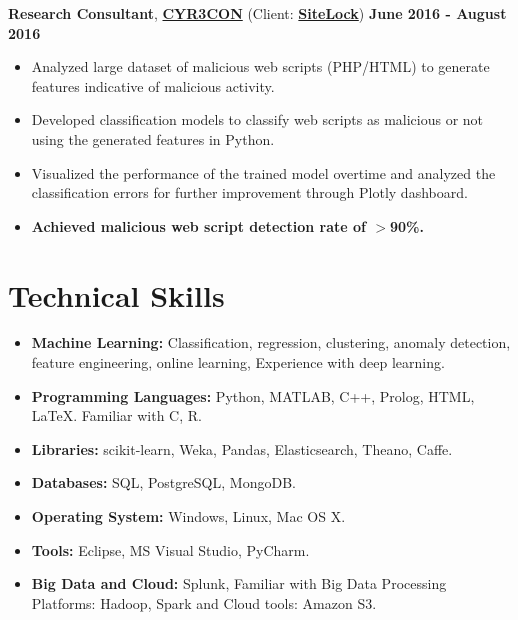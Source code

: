 \documentclass[margin,line]{CV}
\begin{document}
\begin{resume}
\begin{itemize}
\end{itemize}


{\bf Research Consultant}, \href{http://www.cyr3con.com/}{\bf CYR3CON} (Client: \href{https://www.sitelock.com/}{\bf SiteLock})  \hfill {\bf June 2016 - August 2016}
\begin{itemize}
	\item Analyzed large dataset of malicious web scripts (PHP/HTML) to generate features indicative of malicious activity.
	\item Developed classification models to classify web scripts as malicious or not using the generated features in Python.
	\item Visualized the performance of the trained model overtime and analyzed the classification errors for further improvement through Plotly dashboard.
	\item {\bf Achieved malicious web script detection rate of $>$90\%.}
	
\end{itemize}

\section{\sc Technical Skills} 
\begin{itemize}[leftmargin =*]

\item {\bf Machine Learning:} Classification, regression, clustering, anomaly detection, feature engineering, online learning, Experience with deep learning.

\item{\bf Programming Languages:} Python, MATLAB, C++, Prolog, HTML, LaTeX. Familiar with C, R. 

\item{\bf Libraries:} scikit-learn, Weka, Pandas, Elasticsearch, Theano, Caffe. 

\item {\bf Databases:} SQL, PostgreSQL, MongoDB.

\item {\bf Operating System:} Windows, Linux, Mac OS X. 

\item {\bf Tools:} Eclipse, MS Visual Studio, PyCharm. 

\item {\bf Big Data and Cloud:} Splunk, Familiar with Big Data Processing Platforms: Hadoop, Spark and Cloud tools: Amazon S3. 

\end{itemize}



\end{resume}
\end{document}
